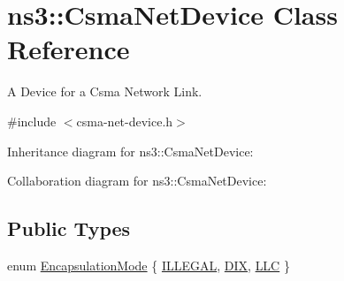 \hypertarget{classns3_1_1CsmaNetDevice}{}\section{ns3\+:\+:Csma\+Net\+Device Class Reference}
\label{classns3_1_1CsmaNetDevice}


A Device for a Csma Network Link.  




{\ttfamily \#include $<$csma-\/net-\/device.\+h$>$}



Inheritance diagram for ns3\+:\+:Csma\+Net\+Device\+:


Collaboration diagram for ns3\+:\+:Csma\+Net\+Device\+:
\subsection*{Public Types}
\begin{DoxyCompactItemize}
\item 
enum \hyperlink{classns3_1_1CsmaNetDevice_a176431468055d41f8e879e33a5362cad}{Encapsulation\+Mode} \{ \hyperlink{classns3_1_1CsmaNetDevice_a176431468055d41f8e879e33a5362cada1f230eaef80ea65f838f089c07981bad}{I\+L\+L\+E\+G\+AL}, 
\hyperlink{classns3_1_1CsmaNetDevice_a176431468055d41f8e879e33a5362cada8cc8287029197a9496df00c6d3f8b9ff}{D\+IX}, 
\hyperlink{classns3_1_1CsmaNetDevice_a176431468055d41f8e879e33a5362cadab3a0dd08ede5405aff1fd939e556dc5b}{L\+LC}
 \}
\end{DoxyCompactItemize}
